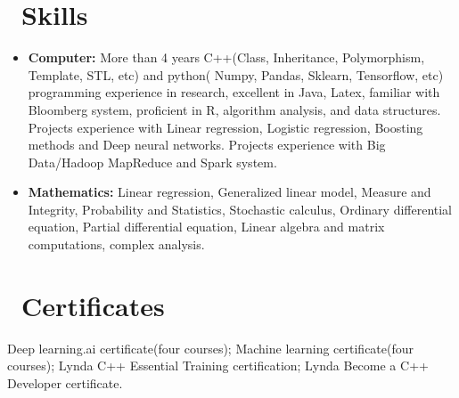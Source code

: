 \documentclass{resume}
\begin{document}
\section{\faWrench
\ Skills}
\begin{itemize}[parsep=0.5ex]\large
  \item \textbf{Computer:} More than 4 years C++(Class,  Inheritance,  Polymorphism,  Template,  STL,  etc) and python( Numpy,  Pandas, 
  Sklearn,  Tensorflow,  etc) programming experience in research,   excellent in Java,  Latex,  familiar with Bloomberg system, proficient in R, algorithm analysis, and data structures. Projects experience with Linear regression, Logistic regression, Boosting methods and Deep neural networks.  Projects experience with Big Data/Hadoop MapReduce and Spark system. 
  
  \item \textbf{Mathematics:}
   Linear regression, Generalized linear model, Measure and Integrity,  Probability and Statistics,  Stochastic calculus, Ordinary differential equation,
  Partial differential equation,  Linear algebra and matrix computations,  complex analysis.
  
\end{itemize}

\section{\faShirtsinbulk \ Certificates}\large 
Deep learning.ai certificate(four courses); Machine learning certificate(four courses); Lynda C++ Essential Training certification; Lynda Become a C++ Developer certificate.

%
%
\end{document}
